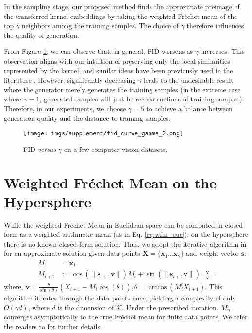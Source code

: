 In the sampling stage, our proposed method finds the approximate preimage of the transferred kernel embeddings by taking the weighted Fr\'{e}chet mean of the top $\gamma$ neighbors among the training samples.
The choice of $\gamma$ therefore influences the quality of generation. 

From Figure \ref{fig:fid_v_gamma}, we can observe that,
in general, FID worsens as $\gamma$ increases. This observation aligns with our intuition of preserving only the local similarities represented by the kernel, and similar ideas have 
been previously used in the literature \citep{hastie2001statisticallearning,kwok2004pre}. However, significantly decreasing $\gamma$ leads 
to the undesirable result where the 
generator merely generates the training samples (in the extreme case where $\gamma = 1$, generated samples will just be reconstructions of training samples). Therefore, in our experiments, we choose $\gamma = 5$ to achieve a balance between generation quality and the distance to training samples.

\begin{figure}[h]
    \centering
    \texttt{[image: imgs/supplement/fid\_curve\_gamma\_2.png]}
    \caption{FID \textit{versus} $\gamma$ on a few computer vision datasets.}
    \label{fig:fid_v_gamma}
\end{figure}

\clearpage
\section{Weighted Fr\'{e}chet Mean on the Hypersphere}
\label{appdx:wfm_sphere}
While the weighted Fr\'{e}chet Mean in Euclidean space can be computed in closed-form as a weighted arithmetic mean (as in Eq. \ref{eq:wfm_euc}), on the hypersphere there is no known closed-form solution. Thus, we adopt the iterative algorithm in \citep{chakraborty2015recursive} for an approximate solution given data points $\mathbf{X} = \{\mathbf{x}_1 \dots \mathbf{x}_\gamma\}$ and weight vector $\mathbf{s}$:
\begin{align*}
    M_1 &= \mathbf{x}_1\\
    M_{i+1} &:= \cos(\|\mathbf{s}_{i+1}\mathbf{v}\|) M_i + \sin(\|\mathbf{s}_{i+1}\mathbf{v}\|)\frac{\mathbf{v}}{\|\mathbf{v}\|}
\end{align*}
where, $\mathbf{v} = \frac{\theta}{\sin(\theta)}\left(X_{i+1} - M_i \cos(\theta)\right), \theta = \arccos(M_i^tX_{i+1})$. This algorithm iterates through the data points once, yielding a complexity of only $O(\gamma d)$, where $d$ is the dimension of $\mathcal{X}$. Under the prescribed iteration, $M_{n}$ converges asymptotically to the true Fr\'{e}chet mean for finite data points. We refer the readers to \citep{chakraborty2015recursive} for further details.

